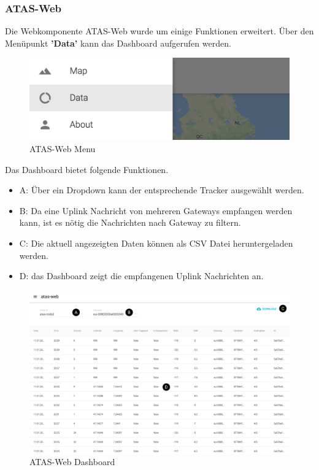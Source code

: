 \documentclass[11pt,english,german]{report}
\theoremstyle{definition}
\begin{document}
\subsubsection{ATAS-Web}
Die Webkomponente ATAS-Web wurde um einige Funktionen erweitert. Über den Menüpunkt \textbf{'Data'} kann das Dashboard aufgerufen werden.
\begin{figure}[H]
	\centering
	\includegraphics[width=\textwidth]{img/testing/atasweb_menu.jpg}
	\caption[ATAS-Web Menu]
	{ATAS-Web Menu}
\end{figure}

\newpage
\noindent
Das Dashboard bietet folgende Funktionen.
\begin{itemize}
	\item A: Über ein Dropdown kann der entsprechende Tracker ausgewählt werden.
	\item B: Da eine Uplink Nachricht von mehreren Gateways empfangen werden kann, ist es nötig die Nachrichten nach Gateway zu filtern.
	\item C: Die aktuell angezeigten Daten können als CSV Datei heruntergeladen werden.
	\item D: das Dashboard zeigt die empfangenen Uplink Nachrichten an. 
\end{itemize}
\begin{figure}[H]
	\centering
	\includegraphics[width=\textwidth]{img/testing/atasweb_data.jpg}
	\caption[ATAS-Web Dashboard]
	{ATAS-Web Dashboard}
\end{figure}
\end{document}
